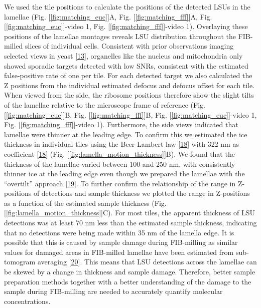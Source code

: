 \documentclass[
]{article}
\begin{document}
We used the tile positions to calculate the positions of the detected
LSUs in the lamellae (Fig. {[}\ref{fig:matching_euc}{]}A, Fig.
{[}\ref{fig:matching_fff}{]}A, Fig. {[}\ref{fig:matching_euc}{]}-video 1, Fig.
{[}\ref{fig:matching_fff}{]}-video 1). Overlaying these positions of
the lamellae montages reveals LSU distribution throughout the FIB-milled
slices of individual cells. Consistent with prior observations imaging
selected views in yeast {[}\protect\hyperlink{ref-T1Qr0xyP}{13}{]}, organelles
like the nucleus and mitochondria only showed sporadic targets detected
with low SNRs, consistent with the estimated false-positive rate of one
per tile. For each detected target we also calculated the Z positions
from the individual estimated defocus and defocus offset for each tile.
When viewed from the side, the ribosome positions therefore show the
slight tilts of the lamellae relative to the microscope frame of
reference (Fig. {[}\ref{fig:matching_euc}{]}B, Fig.
{[}\ref{fig:matching_fff}{]}B, 
Fig. {[}\ref{fig:matching_euc}{]}-video 1, Fig.
{[}\ref{fig:matching_fff}{]}-video 1). Furthermore, the side views indicated that lamellae were
thinner at the leading edge. To confirm this we estimated the ice
thickness in individual tiles using the Beer-Lambert law
{[}\protect\hyperlink{ref-17IP4Lhz1}{18}{]} with 322 nm as coefficient
{[}\protect\hyperlink{ref-17IP4Lhz1}{18}{]} (Fig.
{[}\ref{fig:lamella_motion_thickness}{]}B). We found that the thickness of the
lamellae varied between 100 and 250 nm, with consistently thinner ice at
the leading edge even though we prepared the lamellae with the
``overtilt'' approach {[}\protect\hyperlink{ref-hr3dyUeI}{19}{]}. To further confirm
the relationship of the range in Z-positions of detections and sample
thickness we plotted the range in Z-positions as a function of the
estimated sample thickness (Fig. {[}\ref{fig:lamella_motion_thickness}{]}C). For
most tiles, the apparent thickness of LSU detections was at least 70 nm
less than the estimated sample thickness, indicating that no detections
were being made within 35 nm of the lamella edge. It is possible that
this is caused by sample damage during FIB-milling as similar values for
damaged areas in FIB-milled lamellae have been estimated from
sub-tomogram averaging {[}\protect\hyperlink{ref-SDMGf7aG}{20}{]}. This means that
LSU detections across the lamellae can be skewed by a change in
thickness and sample damage. Therefore, better sample preparation
methods together with a better understanding of the damage to the sample
during FIB-milling are needed to accurately quantify molecular
concentrations.
\end{document}
